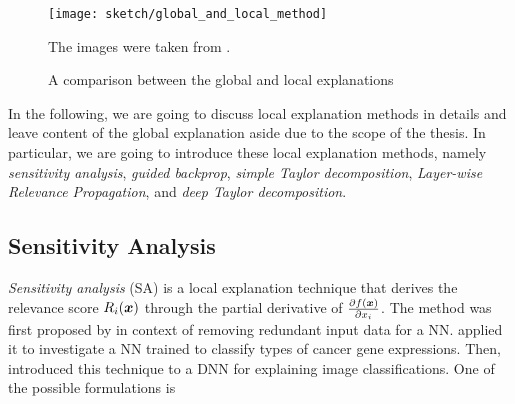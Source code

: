  \begin{figure}
\centering
\texttt{[image: sketch/global\_and\_local\_method]}
\caption{A comparison between the global and local explanations}
\small{
The images were taken from \citet{MontavonExplainingnonlinearclassification2017}.
}
\label{fig:comparision_between_global_and_local_analysis}
\end{figure}

In the following, we are going to discuss local explanation methods in details and leave content of the global explanation aside due to the scope of the thesis. In particular, we are going to introduce these local explanation methods, namely \textit{sensitivity analysis}, \textit{guided backprop}, \textit{simple Taylor decomposition}, \textit{Layer-wise Relevance Propagation}, and \textit{deep Taylor decomposition}.


%

\subsection{Sensitivity Analysis}
\textit{Sensitivity analysis} (SA) is a local explanation technique that derives the relevance score $R_i(\boldsymbol{x})$ through the  partial derivative of $\frac{\partial f(\patvector{x})}{ \partial x_i }$.  The method was first proposed by \citet{ZuradaSensitivityAnalysisMinimization1994} in context of removing redundant input data for a NN. \citet{KhanClassificationdiagnosticprediction2001} applied it to investigate a NN trained to classify types of cancer gene expressions. Then, \citet{SimonyanDeepConvolutionalNetworks2013} introduced this technique to a DNN for explaining image classifications. One of the possible formulations is 

